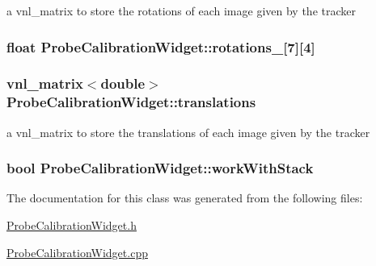 a vnl\-\_\-matrix to store the rotations of each image given by the tracker 

\hypertarget{class_probe_calibration_widget_ad73b59c52447ede4f5976f05741bc16a}{
\subsubsection[{rotations\-\_\-2}]{\setlength{\rightskip}{0pt plus 5cm}float {\bf Probe\-Calibration\-Widget\-::rotations\-\_}\mbox{[}7\mbox{]}\mbox{[}4\mbox{]}}}\label{d2/d39/class_probe_calibration_widget_ad73b59c52447ede4f5976f05741bc16a}
\hypertarget{class_probe_calibration_widget_a7d65e018cd29fd62b2d9b1aca19e3276}{
\subsubsection[{translations}]{\setlength{\rightskip}{0pt plus 5cm}vnl\-\_\-matrix$<$double$>$ {\bf Probe\-Calibration\-Widget\-::translations}}}\label{d2/d39/class_probe_calibration_widget_a7d65e018cd29fd62b2d9b1aca19e3276}


a vnl\-\_\-matrix to store the translations of each image given by the tracker 

\hypertarget{class_probe_calibration_widget_a15fe2768facb79d700b4481479e56ad0}{
\subsubsection[{work\-With\-Stack}]{\setlength{\rightskip}{0pt plus 5cm}bool {\bf Probe\-Calibration\-Widget\-::work\-With\-Stack}}}\label{d2/d39/class_probe_calibration_widget_a15fe2768facb79d700b4481479e56ad0}


The documentation for this class was generated from the following files\-:\begin{DoxyCompactItemize}
\item 
\hyperlink{_probe_calibration_widget_8h}{Probe\-Calibration\-Widget.\-h}\item 
\hyperlink{_probe_calibration_widget_8cpp}{Probe\-Calibration\-Widget.\-cpp}\end{DoxyCompactItemize}

